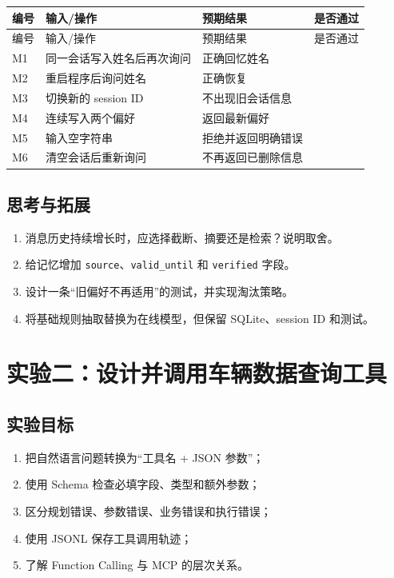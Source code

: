 \documentclass[UTF8,zihao=-4]{ctexart}
\begin{document}
\begin{longtable}{C{1.2cm} L{4.5cm} L{4.8cm} C{2.1cm}}
\toprule
编号 & 输入/操作 & 预期结果 & 是否通过\\
\midrule
\endfirsthead
\toprule
编号 & 输入/操作 & 预期结果 & 是否通过\\
\midrule
\endhead
M1 & 同一会话写入姓名后再次询问 & 正确回忆姓名 & \\
M2 & 重启程序后询问姓名 & 正确恢复 & \\
M3 & 切换新的 session ID & 不出现旧会话信息 & \\
M4 & 连续写入两个偏好 & 返回最新偏好 & \\
M5 & 输入空字符串 & 拒绝并返回明确错误 & \\
M6 & 清空会话后重新询问 & 不再返回已删除信息 & \\
\bottomrule
\end{longtable}

\subsection{思考与拓展}

\begin{enumerate}
  \item 消息历史持续增长时，应选择截断、摘要还是检索？说明取舍。
  \item 给记忆增加 \texttt{source}、\texttt{valid\_until} 和 \texttt{verified} 字段。
  \item 设计一条“旧偏好不再适用”的测试，并实现淘汰策略。
  \item 将基础规则抽取替换为在线模型，但保留 SQLite、session ID 和测试。
\end{enumerate}

\section{实验二：设计并调用车辆数据查询工具}

\subsection{实验目标}

\begin{enumerate}
  \item 把自然语言问题转换为“工具名 + JSON 参数”；
  \item 使用 Schema 检查必填字段、类型和额外参数；
  \item 区分规划错误、参数错误、业务错误和执行错误；
  \item 使用 JSONL 保存工具调用轨迹；
  \item 了解 Function Calling 与 MCP 的层次关系。
\end{enumerate}
\end{document}
